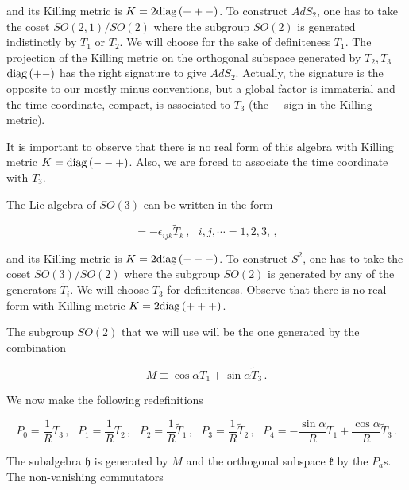 \documentclass[12pt,a4paper]{article}
\begin{document}
\noindent
and its Killing metric is $K=2{\rm diag}\, (++-)$. To construct
$AdS_{2}$, one has to take the coset $SO(2,1)/SO(2)$ where the
subgroup $SO(2)$ is generated indistinctly by $T_{1}$ or $T_{2}$. We
will choose for the sake of definiteness $T_{1}$. The projection of
the Killing metric on the orthogonal subspace generated by
$T_{2},T_{3}$ ${\rm diag}\, (+-)$ has the right signature to give
$AdS_{2}$. Actually, the signature is the opposite to our mostly minus
conventions, but a global factor is immaterial and the time
coordinate, compact, is associated to $T_{3}$ (the $-$ sign in the
Killing metric).

It is important to observe that there is no real form of this algebra
with Killing metric $K={\rm diag}\, (--+)$. Also, we are forced to
associate the time coordinate with $T_{3}$.
 
The Lie algebra of $SO(3)$ can be written in the form

\begin{equation}
[\tilde{T}_{i},\tilde{T}_{j}]=-\epsilon_{ijk}\tilde{T}_{k}\, ,
\,\,\,\,
i,j,\cdots=1,2,3,\, ,   
\end{equation}

\noindent
and its Killing metric is $K=2{\rm diag}\, (---)$. To construct
$S^{2}$, one has to take the coset $SO(3)/SO(2)$ where the subgroup
$SO(2)$ is generated by any of the generators $\tilde{T}_{i}$. We will
choose $T_{3}$ for definiteness. Observe that there is no real form
with Killing metric $K=2{\rm diag}\, (+++)$.

The subgroup $SO(2)$ that we will use will be the one generated by the
combination

\begin{equation}
M \equiv \cos{\alpha} T_{1} +\sin{\alpha}\tilde{T}_{3}\, .  
\end{equation}

We now make the following redefinitions

\begin{equation}
P_{0}={\textstyle\frac{1}{R}}T_{3}\, ,
\,\,\,\,
P_{1}={\textstyle\frac{1}{R}}T_{2}\, ,
\,\,\,\,
P_{2}={\textstyle\frac{1}{R}}\tilde{T}_{1}\, ,
\,\,\,\,
P_{3}={\textstyle\frac{1}{R}}\tilde{T}_{2}\, ,
\,\,\,\,
P_{4}=-{\textstyle\frac{\sin{\alpha}}{R}}T_{1}
+{\textstyle\frac{\cos{\alpha}}{R}}\tilde{T}_{3}\, .
\end{equation}

The subalgebra $\mathfrak{h}$ is generated by $M$ and the orthogonal
subspace $\mathfrak{k}$ by the $P_{a}$s. The non-vanishing commutators
\end{document}
